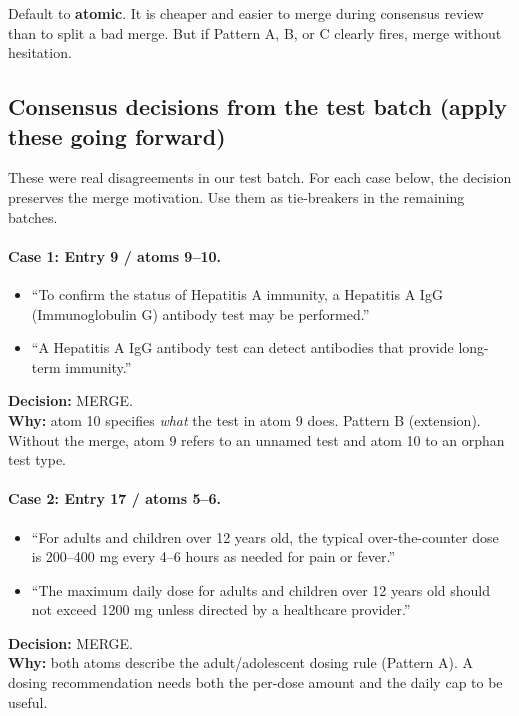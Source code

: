 \documentclass{article}
\begin{document}
Default to \textbf{atomic}. It is cheaper and easier to merge during consensus review than to split a bad merge. But if Pattern A, B, or C clearly fires, merge without hesitation.

\subsection{Consensus decisions from the test batch (apply these going forward)}
\label{sec:consensus-decisions}

These were real disagreements in our test batch. For each case below, the decision preserves the merge motivation. Use them as tie-breakers in the remaining batches.

\paragraph{Case 1: Entry 9 / atoms 9--10.}
\begin{itemize}[leftmargin=1.8em,labelsep=0.5em,itemsep=2pt,topsep=3pt]
    \item[\textit{atom 9:}] ``To confirm the status of Hepatitis A immunity, a Hepatitis A IgG (Immunoglobulin G) antibody test may be performed.''
    \item[\textit{atom 10:}] ``A Hepatitis A IgG antibody test can detect antibodies that provide long-term immunity.''
\end{itemize}
\noindent\textbf{Decision:} MERGE. \\
\noindent\textbf{Why:} atom 10 specifies \textit{what} the test in atom 9 does. Pattern B (extension). Without the merge, atom 9 refers to an unnamed test and atom 10 to an orphan test type.

\medskip
\paragraph{Case 2: Entry 17 / atoms 5--6.}
\begin{itemize}[leftmargin=1.8em,labelsep=0.5em,itemsep=2pt,topsep=3pt]
    \item[\textit{atom 5:}] ``For adults and children over 12 years old, the typical over-the-counter dose is 200--400 mg every 4--6 hours as needed for pain or fever.''
    \item[\textit{atom 6:}] ``The maximum daily dose for adults and children over 12 years old should not exceed 1200 mg unless directed by a healthcare provider.''
\end{itemize}
\noindent\textbf{Decision:} MERGE. \\
\noindent\textbf{Why:} both atoms describe the adult/adolescent dosing rule (Pattern A). A dosing recommendation needs both the per-dose amount and the daily cap to be useful.
\end{document}
